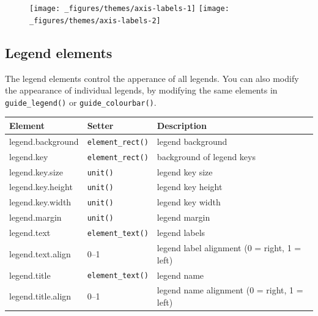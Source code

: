 \begin{Shaded}
\begin{Highlighting}[]
\StringTok{ }\NormalTok{(}
   \NormalTok{(}\NormalTok{, }\NormalTok{, }\NormalTok{), }
   \NormalTok{:}
\NormalTok{)}
\StringTok{ }\StringTok{ }\NormalTok{()}
\StringTok{ }
\StringTok{  }\NormalTok{(} \NormalTok{(} \NormalTok{-}\NormalTok{, } \NormalTok{, } \NormalTok{)) +}\StringTok{ }
\StringTok{  }\NormalTok{(}\NormalTok{) +}\StringTok{ }
\StringTok{  }\NormalTok{(}\NormalTok{)}
\end{Highlighting}
\end{Shaded}

\begin{figure}[H]
  \texttt{[image: \_figures/themes/axis-labels-1]}%
  \texttt{[image: \_figures/themes/axis-labels-2]}
\end{figure}

\subsection{Legend elements}

 

The legend elements control the apperance of all legends. You can also
modify the appearance of individual legends, by modifying the same
elements in \texttt{guide\_legend()} or \texttt{guide\_colourbar()}.

\begin{longtable}[c]{@{}lll@{}}
\toprule
Element & Setter & Description\tabularnewline
\midrule
\endhead
legend.background & \texttt{element\_rect()} & legend
background\tabularnewline
legend.key & \texttt{element\_rect()} & background of legend
keys\tabularnewline
legend.key.size & \texttt{unit()} & legend key size\tabularnewline
legend.key.height & \texttt{unit()} & legend key height\tabularnewline
legend.key.width & \texttt{unit()} & legend key width\tabularnewline
legend.margin & \texttt{unit()} & legend margin\tabularnewline
legend.text & \texttt{element\_text()} & legend labels\tabularnewline
legend.text.align & 0--1 & legend label alignment (0 = right, 1 =
left)\tabularnewline
legend.title & \texttt{element\_text()} & legend name\tabularnewline
legend.title.align & 0--1 & legend name alignment (0 = right, 1 =
left)\tabularnewline
\bottomrule
\end{longtable}

